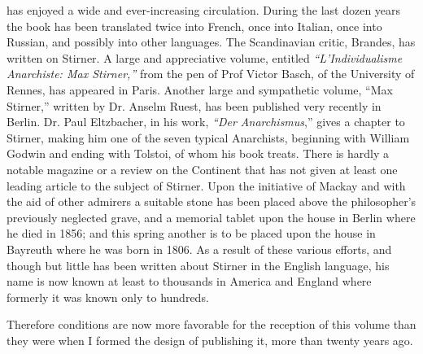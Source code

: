 has enjoyed a wide and ever-increasing circulation. During the last dozen 
years the book has been translated twice into French, once into Italian, once 
into Russian, and possibly into other languages. The Scandinavian critic, 
Brandes, has written on Stirner. A large and appreciative volume, entitled 
\textit{``L'Individualisme Anarchiste: Max Stirner,''} from the pen of Prof 
Victor Basch, of the University of Rennes, has appeared in Paris. Another 
large and sympathetic volume, ``Max Stirner,'' written by Dr. Anselm Ruest, 
has been published very recently in Berlin. Dr. Paul Eltzbacher, in his work, 
\textit{``Der Anarchismus},'' gives a chapter to Stirner, making him one of 
the seven typical Anarchists, beginning with William Godwin and ending with 
Tolstoi, of whom his book treats. There is hardly a notable magazine or a 
review on the Continent that has not given at least one leading article to the 
subject of Stirner. Upon the initiative of Mackay and with the aid of other 
admirers a suitable stone has been placed above the philosopher's previously 
neglected grave, and a memorial tablet upon the house in Berlin where he died 
in 1856; and this spring another is to be placed upon the house in Bayreuth 
where he was born in 1806. As a result of these various efforts, and though 
but little has been written about Stirner in the English language, his name is 
now known at least to thousands in America and England where formerly it was 
known only to hundreds.

Therefore conditions are now more favorable for the reception of this volume 
than they were when I formed the design of publishing it, more than twenty 
years ago.

